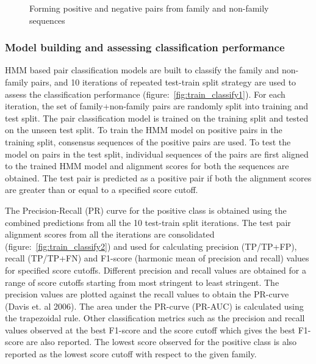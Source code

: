 \documentclass{article}
\begin{document}
			\begin{figure}
				\caption{Forming positive and negative pairs from family and non-family sequences}
				\label{fig:forming_pairs}
			\end{figure}
			
			\subsubsection{Model building and assessing classification performance}
			HMM based pair classification models are built to classify the family and non-family pairs, and 10 iterations of repeated test-train split strategy are used to assess the classification performance (figure:~\ref{fig:train_classify1}). For each iteration, the set of family+non-family pairs are randomly split into training and test split. The pair classification model is trained on the training split and tested on the unseen test split. To train the HMM model on positive pairs in the training split, consensus sequences of the positive pairs are used. To test the model on pairs in the test split, individual sequences of the pairs are first aligned to the trained HMM model and alignment scores for both the sequences are obtained. The test pair is predicted as a positive pair if both the alignment scores are greater than or equal to a specified score cutoff.
			
			The Precision-Recall (PR) curve for the positive class is obtained using the combined predictions from all the 10 test-train split iterations. The test pair alignment scores from all the iterations are consolidated (figure:~\ref{fig:train_classify2}) and used for calculating precision (TP/TP+FP), recall (TP/TP+FN) and F1-score (harmonic mean of precision and recall) values for specified score cutoffs. Different precision and recall values are obtained for a range of score cutoffs starting from most stringent to least stringent. The precision values are plotted against the recall values to obtain the PR-curve (Davis et. al 2006). The area under the PR-curve (PR-AUC) is calculated using the trapezoidal rule. Other classification metrics such as the precision and recall values observed at the best F1-score and the score cutoff which gives the best F1-score are also reported. The lowest score observed for the positive class is also reported as the lowest score cutoff with respect to the given family. 
			
\end{document}
